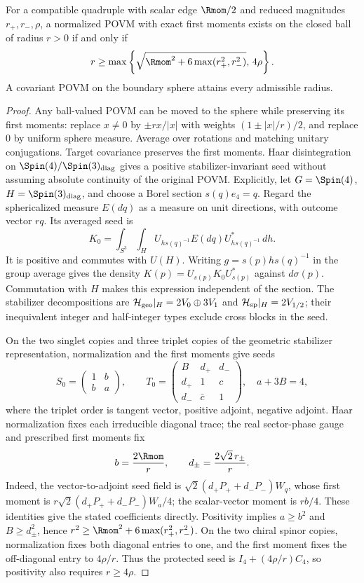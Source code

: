 \documentclass[11pt,a4paper]{article}
\begin{document}
\begin{theorem}
\label{p2c:thm:full-atlas-povm-radius}
For a compatible quadruple with scalar edge $\Rmom/2$ and reduced magnitudes
$r_+,r_-,\rho$, a normalized POVM with exact first moments exists on the
closed ball of radius $r>0$ if and only if
\[
 r\ge\max\left\{
        \sqrt{\Rmom^2+6\max(r_+^2,r_-^2)},\,4\rho\right\}.
\]
A covariant POVM on the boundary sphere attains every admissible radius.
\end{theorem}
\begin{proof}
Any ball-valued POVM can be moved to the sphere while preserving its first
moments: replace $x\ne0$ by $\pm r x/|x|$ with weights
$(1\pm|x|/r)/2$, and replace $0$ by uniform sphere measure.
Average over rotations and matching unitary conjugations. Target covariance
preserves the first moments. Haar disintegration on
$\Spin(4)/\Spin(3)_{\rm diag}$ gives a positive stabilizer-invariant seed without assuming absolute
continuity of the original POVM. Explicitly, let $G=\Spin(4)$,
$H=\Spin(3)_{\rm diag}$, and choose a Borel section $s(q)e_4=q$.
Regard the sphericalized measure $E(dq)$ as a measure on unit directions,
with outcome vector $rq$. Its averaged seed is
\[
 K_0=\int_{S^3}\int_H U_{h s(q)^{-1}}E(dq)U_{h s(q)^{-1}}^*\,dh.
\]
It is positive and commutes with $U(H)$. Writing
$g=s(p)h s(q)^{-1}$ in the group average gives the density
$K(p)=U_{s(p)}K_0U_{s(p)}^*$ against $d\sigma(p)$.
Commutation with $H$ makes this expression independent of the section.
The stabilizer decompositions are
$\mathcal H_{\rm geo}|_H=2V_0\oplus3V_1$ and
$\mathcal H_{\rm sp}|_H=2V_{1/2}$; their inequivalent integer and half-integer
types exclude cross blocks in the seed.

On the two singlet copies and three triplet copies of the geometric
stabilizer representation, normalization and the first moments give seeds
\[
 S_0=\begin{pmatrix}1&b\\ b&a\end{pmatrix},\qquad
 T_0=\begin{pmatrix}B&d_+&d_-\\d_+&1&c\\d_-&\bar c&1\end{pmatrix},
\quad
 a+3B=4,
\]
where the triplet order is tangent vector, positive adjoint, negative
adjoint. Haar normalization fixes each irreducible diagonal trace;
the real sector-phase gauge and prescribed first moments fix
\[
 b=\frac{2\Rmom}{r},\qquad d_\pm=\frac{2\sqrt2\,r_\pm}{r}.
\]
Indeed, the vector-to-adjoint seed field is
$\sqrt2(d_+P_++d_-P_-)W_q$, whose first moment is
$r\sqrt2(d_+P_++d_-P_-)W_a/4$; the scalar-vector moment is $rb/4$.
These identities give the stated coefficients directly.
Positivity implies $a\ge b^2$ and $B\ge d_\pm^2$, hence
$r^2\ge\Rmom^2+6\max(r_+^2,r_-^2)$.
On the two chiral spinor copies, normalization fixes both diagonal
entries to one, and the first moment fixes the off-diagonal entry to
$4\rho/r$. Thus the protected seed is $I_4+(4\rho/r)C_4$, so positivity also requires
$r\ge4\rho$.


\end{proof}
\end{document}
